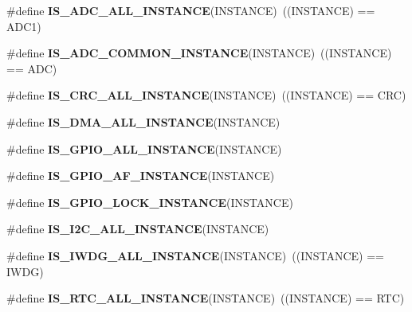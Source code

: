 \begin{DoxyCompactItemize}
\item 
\mbox{\label{group___exported__macro_ga2204b62b378bcf08b3b9006c184c7c23}} 
\#define {\bfseries I\+S\+\_\+\+A\+D\+C\+\_\+\+A\+L\+L\+\_\+\+I\+N\+S\+T\+A\+N\+CE}(I\+N\+S\+T\+A\+N\+CE)~((I\+N\+S\+T\+A\+N\+CE) == A\+D\+C1)
\item 
\mbox{\label{group___exported__macro_gad8a5831c786b6b265531b890a194cbe2}} 
\#define {\bfseries I\+S\+\_\+\+A\+D\+C\+\_\+\+C\+O\+M\+M\+O\+N\+\_\+\+I\+N\+S\+T\+A\+N\+CE}(I\+N\+S\+T\+A\+N\+CE)~((I\+N\+S\+T\+A\+N\+CE) == A\+DC)
\item 
\mbox{\label{group___exported__macro_gaa514941a7f02f65eb27450c05e4e8dd1}} 
\#define {\bfseries I\+S\+\_\+\+C\+R\+C\+\_\+\+A\+L\+L\+\_\+\+I\+N\+S\+T\+A\+N\+CE}(I\+N\+S\+T\+A\+N\+CE)~((I\+N\+S\+T\+A\+N\+CE) == C\+RC)
\item 
\#define {\bfseries I\+S\+\_\+\+D\+M\+A\+\_\+\+A\+L\+L\+\_\+\+I\+N\+S\+T\+A\+N\+CE}(I\+N\+S\+T\+A\+N\+CE)
\item 
\#define {\bfseries I\+S\+\_\+\+G\+P\+I\+O\+\_\+\+A\+L\+L\+\_\+\+I\+N\+S\+T\+A\+N\+CE}(I\+N\+S\+T\+A\+N\+CE)
\item 
\#define {\bfseries I\+S\+\_\+\+G\+P\+I\+O\+\_\+\+A\+F\+\_\+\+I\+N\+S\+T\+A\+N\+CE}(I\+N\+S\+T\+A\+N\+CE)
\item 
\#define {\bfseries I\+S\+\_\+\+G\+P\+I\+O\+\_\+\+L\+O\+C\+K\+\_\+\+I\+N\+S\+T\+A\+N\+CE}(I\+N\+S\+T\+A\+N\+CE)
\item 
\#define {\bfseries I\+S\+\_\+\+I2\+C\+\_\+\+A\+L\+L\+\_\+\+I\+N\+S\+T\+A\+N\+CE}(I\+N\+S\+T\+A\+N\+CE)
\item 
\mbox{\label{group___exported__macro_gad9ec4c52f0572ee67d043e006f1d5e39}} 
\#define {\bfseries I\+S\+\_\+\+I\+W\+D\+G\+\_\+\+A\+L\+L\+\_\+\+I\+N\+S\+T\+A\+N\+CE}(I\+N\+S\+T\+A\+N\+CE)~((I\+N\+S\+T\+A\+N\+CE) == I\+W\+DG)
\item 
\mbox{\label{group___exported__macro_gab4230e8bd4d88adc4250f041d67375ce}} 
\#define {\bfseries I\+S\+\_\+\+R\+T\+C\+\_\+\+A\+L\+L\+\_\+\+I\+N\+S\+T\+A\+N\+CE}(I\+N\+S\+T\+A\+N\+CE)~((I\+N\+S\+T\+A\+N\+CE) == R\+TC)
\item 
\mbox{\label{group___exported__macro_gaf492fcfe71eab8d1dadf4d837b840af6}} 

\end{DoxyCompactItemize}
